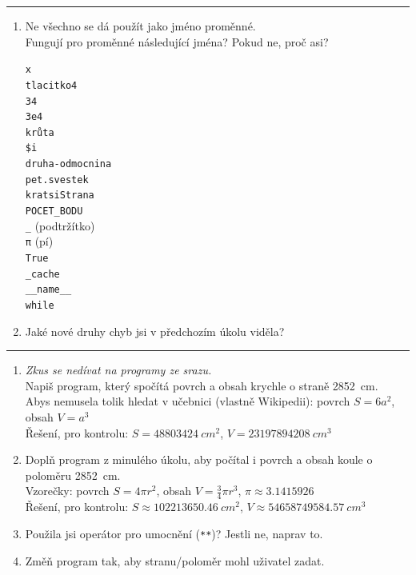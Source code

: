 \documentclass[a4paper,10pt]{article}
\begin{document}
\hrule

\begin{enumerate}[resume]
\item Ne všechno se dá použít jako jméno proměnné.
    \\Fungují pro proměnné následující jména? Pokud ne, proč asi?
    {
        \newcommand\varname[2][]{\varnameend[#1]{#2}\\[0.5cm]}
        \newcommand\varnameend[2][]{\texttt{#2} #1}
        \begin{multicols}{4}
        \varname{x}
        \varname{tlacitko4}
        \varname{34}
        \varname{3e4}
        \varname{krůta}
        \varname{\$i}
        \varname{druha-odmocnina}
        \varname{pet.svestek}
        \varname{kratsiStrana}
        \varname{POCET\_BODU}
        \varname[(podtržítko)]{\_}
        \varname[(pí)]{\textrm{π}}
        \varname{True}
        \varname{\_cache}
        \varname{\_\_name\_\_}
        \varnameend{while}
        \end{multicols}
    }
    \hspace{0.5cm}
\item Jaké nové druhy chyb jsi v předchozím úkolu viděla?

\end{enumerate}

\hrule

\begin{enumerate}[resume]

\item \emph{\small Zkus se nedívat na programy ze srazu.}
    \\Napiš program, který spočítá povrch a obsah krychle o straně \SI{2852}{cm}.
    \\Abys nemusela tolik hledat v učebnici (vlastně Wikipedii): povrch $S=6a^2$, obsah $V=a^3$
    \\Řešení, pro kontrolu: $S=\SI{48803424}{cm^2}$, $V=\SI{23197894208}{cm^3}$

\item Doplň program z minulého úkolu, aby počítal i povrch a obsah koule o poloměru \SI{2852}{cm}.
    \\Vzorečky: povrch $S=4\pi r^2$, obsah $V=\frac34\pi r^3$, $\pi \approx 3.1415926$
    \\Řešení, pro kontrolu: $S\approx\SI{102213650,46}{cm^2}$, $V\approx\SI{54658749584,57}{cm^3}$

\item Použila jsi operátor pro umocnění (\texttt{**})? Jestli ne, naprav to.

\item Změň program tak, aby stranu/poloměr mohl uživatel zadat.

\end{enumerate}
\end{document}
